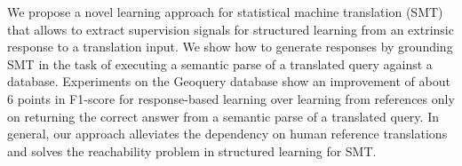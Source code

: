 We propose a novel learning approach for statistical machine translation (SMT) that allows to extract supervision signals for structured learning from an extrinsic response to a translation input. We show how to generate responses by grounding SMT in the task of executing a semantic parse of a translated query against a database. Experiments on the Geoquery database show an improvement of about 6 points in F1-score for response-based learning over learning from references only on returning the correct answer from a semantic parse of a translated query. In general, our approach alleviates the dependency on human reference translations and solves the reachability problem in structured learning for SMT.
